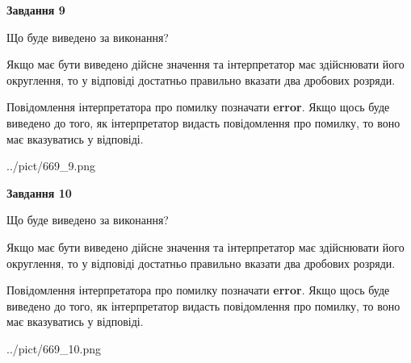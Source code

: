 \documentclass[12pt, ukrainian]{article}
\begin{document}
{\begin {Large}
{\begin {center}\textbf{Завдання 9}\end {center}}\par
Що буде виведено за виконання? \par

Якщо має бути виведено дійсне значення та інтерпретатор має здійснювати його округлення, 
то у відповіді достатньо правильно вказати два дробових розряди.

Повідомлення інтерпретатора про помилку позначати \textbf{error}.
Якщо щось буде виведено до того, як інтерпретатор видасть повідомлення про помилку, 
то воно має вказуватись у відповіді. \par

\begin{center}
	{../pict/669_9.png}
\end{center}
\newpage

{\begin {center}\textbf{Завдання 10}\end {center}}\par
Що буде виведено за виконання? \par

Якщо має бути виведено дійсне значення та інтерпретатор має здійснювати його округлення, 
то у відповіді достатньо правильно вказати два дробових розряди.

Повідомлення інтерпретатора про помилку позначати \textbf{error}.
Якщо щось буде виведено до того, як інтерпретатор видасть повідомлення про помилку, 
то воно має вказуватись у відповіді. \par

\begin{center}
	{../pict/669_10.png}
\end{center}
\newpage

\end {Large}}
\end{document}
